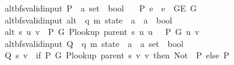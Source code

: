 \begin{isabellebody}
\isanewline
{}\isamarkupfalse%
\ {\isacharparenleft}{\kern0pt}\ alt{\isacharunderscore}{\kern0pt}bfs{\isacharunderscore}{\kern0pt}valid{\isacharunderscore}{\kern0pt}input{\isacharparenright}{\kern0pt}\ P{\isacharprime}{\kern0pt}{\isacharprime}{\kern0pt}\ {\isacharcolon}{\kern0pt}{\isacharcolon}{\kern0pt}\ {\isachardoublequoteopen}{\isacharprime}{\kern0pt}a\ set\ {\isasymRightarrow}\ bool{\isachardoublequoteclose}\ \isanewline
\ \ {\isachardoublequoteopen}P{\isacharprime}{\kern0pt}{\isacharprime}{\kern0pt}\ e\ {\isasymequiv}\ e\ {\isasymin}\ G{\isachardot}{\kern0pt}E\ G{}{\isachardoublequoteclose}\isanewline
\isanewline
{}\isamarkupfalse%
\ {\isacharparenleft}{\kern0pt}\ alt{\isacharunderscore}{\kern0pt}bfs{\isacharunderscore}{\kern0pt}valid{\isacharunderscore}{\kern0pt}input{\isacharparenright}{\kern0pt}\ alt\ {\isacharcolon}{\kern0pt}{\isacharcolon}{\kern0pt}\ {\isachardoublequoteopen}{\isacharparenleft}{\kern0pt}{\isacharprime}{\kern0pt}q{\isacharcomma}{\kern0pt}\ {\isacharprime}{\kern0pt}m{\isacharparenright}{\kern0pt}\ state\ {\isasymRightarrow}\ {\isacharprime}{\kern0pt}a\ {\isasymRightarrow}\ {\isacharprime}{\kern0pt}a\ {\isasymRightarrow}\ bool{\isachardoublequoteclose}\ \isanewline
\ \ {\isachardoublequoteopen}alt\ s\ u\ v\ {\isasymequiv}\ P{\isacharprime}{\kern0pt}\ G{}\ {\isacharparenleft}{\kern0pt}P{\isacharunderscore}{\kern0pt}lookup\ {\isacharparenleft}{\kern0pt}parent\ s{\isacharparenright}{\kern0pt}\ u{\isacharparenright}{\kern0pt}\ u\ {\isasymlongleftrightarrow}\ {\isasymnot}\ P\ G{}\ u\ v{\isachardoublequoteclose}\isanewline
\isanewline
{}\isamarkupfalse%
\ {\isacharparenleft}{\kern0pt}\ alt{\isacharunderscore}{\kern0pt}bfs{\isacharunderscore}{\kern0pt}valid{\isacharunderscore}{\kern0pt}input{\isacharparenright}{\kern0pt}\ Q\ {\isacharcolon}{\kern0pt}{\isacharcolon}{\kern0pt}\ {\isachardoublequoteopen}{\isacharparenleft}{\kern0pt}{\isacharprime}{\kern0pt}q{\isacharcomma}{\kern0pt}\ {\isacharprime}{\kern0pt}m{\isacharparenright}{\kern0pt}\ state\ {\isasymRightarrow}\ {\isacharprime}{\kern0pt}a\ {\isasymRightarrow}\ {\isacharprime}{\kern0pt}a\ set\ {\isasymRightarrow}\ bool{\isachardoublequoteclose}\ \isanewline
\ \ {\isachardoublequoteopen}Q\ s\ v\ {\isasymequiv}\ if\ P{\isacharprime}{\kern0pt}\ G{}\ {\isacharparenleft}{\kern0pt}P{\isacharunderscore}{\kern0pt}lookup\ {\isacharparenleft}{\kern0pt}parent\ s{\isacharparenright}{\kern0pt}\ v{\isacharparenright}{\kern0pt}\ v\ then\ {\isacharparenleft}{\kern0pt}Not\ {\isasymcirc}\ P{\isacharprime}{\kern0pt}{\isacharprime}{\kern0pt}{\isacharparenright}{\kern0pt}\ else\ P{\isacharprime}{\kern0pt}{\isacharprime}{\kern0pt}{\isachardoublequoteclose}\isanewline

\end{isabellebody}
